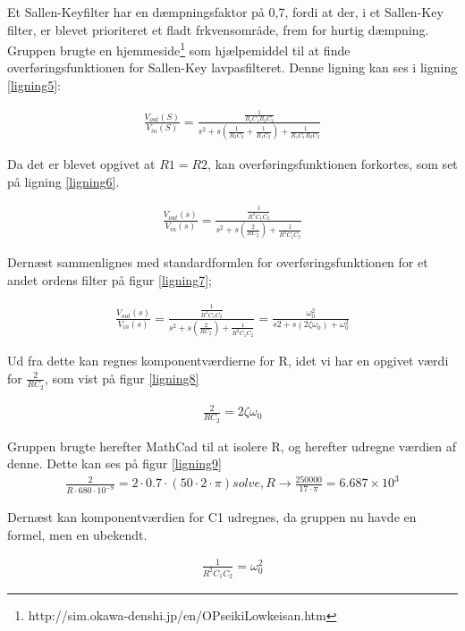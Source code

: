 Et Sallen-Keyfilter har en dæmpningsfaktor på 0,7, fordi at der, i et Sallen-Key filter, er blevet prioriteret et fladt frkvensområde, frem for hurtig dæmpning. Gruppen brugte en hjemmeside\footnote{http://sim.okawa-denshi.jp/en/OPseikiLowkeisan.htm} som hjælpemiddel til at finde overføringsfunktionen for Sallen-Key lavpasfilteret. Denne ligning kan ses i ligning \ref{ligning5}:


\begin{align}
	\frac{V_{out}(S)}{V_{in}(S)}=\frac{\frac{1}{R_1C_1R_2C_2}}{s^2+s(\frac{1}{R_2C_2}+\frac{1}{R_1C_2})+\frac{1}{R_1C_1R_2C_2}}
	\label{ligning5}
\end{align}

Da det er blevet opgivet at $R1=R2$, kan overføringsfunktionen forkortes, som set på ligning \ref{ligning6}.

\begin{align}
\frac{V_{out}(s)}{V_{in}(s)}=\frac{\frac{1}{R^2C_{1}C_{2}}}{s^2+s(\frac{2}{RC_{2}})+\frac{1}{R^2C_{1}C_{2}}}
\label{ligning6}
\end{align}

Dernæst sammenlignes med standardformlen for overføringsfunktionen for et andet ordens filter på figur \ref{ligning7};

\begin{align}
\frac{V_{out}(s)}{V_{in}(s)} = \frac{\frac{1}{R^{2}C_{1} C_{2}}}{s^2+s(\frac{2}{RC_{2}})+\frac{1}{R^{2}C_{1}C_{2}}} = \frac{\omega_{0}^{2}}{s{2}+s(2\zeta\omega_{0})+\omega_{0}^{2}}
\label{ligning7}
\end{align}

Ud fra dette kan regnes komponentværdierne for R, idet vi har en opgivet værdi for $\frac{2}{RC_{2}}$, som vist på figur \ref{ligning8}

\begin{align}
\frac{2}{RC_{2}}=2\zeta\omega_{0}
\label{ligning8}
\end{align}

Gruppen brugte herefter MathCad til at isolere R, og herefter udregne værdien af denne. Dette kan ses på figur \ref{ligning9}
\begin{align}
\frac{2}{R\cdot680\cdot10^{-9}}=2\cdot0.7\cdot(50\cdot2\cdot\pi) solve, R \to \frac{250000}{17\cdot\pi}=6.687\times 10^3
\label{ligning9}
\end{align}

Dernæst kan komponentværdien for C1 udregnes, da gruppen nu havde en formel, men en ubekendt.


\begin{align*}
\frac{1}{R^2C_{1}C_{2}}=\omega_{0}^2
\label{ligning10}
\end{align*}	

